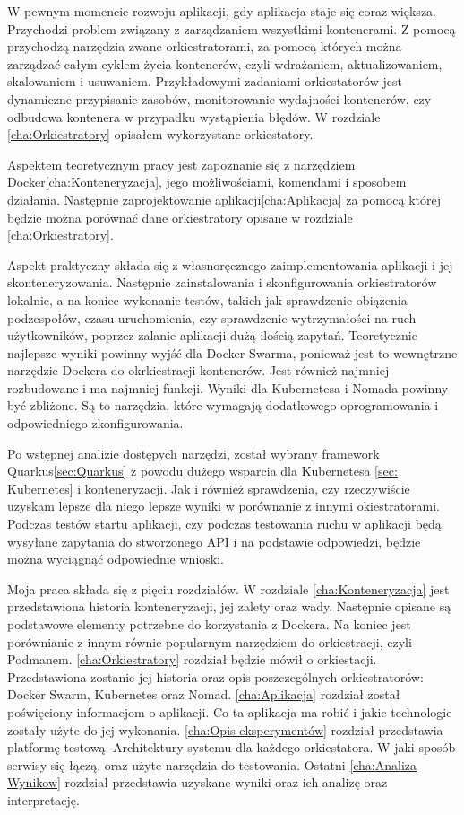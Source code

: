 \documentclass{iiuwb}
\begin{document}
W pewnym momencie rozwoju aplikacji, gdy aplikacja staje się coraz większa. Przychodzi problem związany z zarządzaniem wszystkimi kontenerami. Z pomocą przychodzą narzędzia zwane orkiestratorami, za pomocą których można zarządzać całym cyklem życia kontenerów, czyli wdrażaniem, aktualizowaniem, skalowaniem i usuwaniem. Przykładowymi zadaniami orkiestatorów jest dynamiczne przypisanie zasobów, monitorowanie wydajności kontenerów, czy odbudowa kontenera w przypadku wystąpienia błędów. W rozdziale \ref{cha:Orkiestratory} opisałem wykorzystane orkiestatory.

Aspektem teoretycznym pracy jest zapoznanie się z narzędziem Docker\ref{cha:Konteneryzacja}, jego możliwościami, komendami i sposobem działania. Następnie zaprojektowanie aplikacji\ref{cha:Aplikacja} za pomocą której będzie można porównać dane orkiestratory opisane w rozdziale \ref{cha:Orkiestratory}.

Aspekt praktyczny składa się z własnoręcznego zaimplementowania aplikacji i jej skonteneryzowania. Następnie zainstalowania i skonfigurowania orkiestratorów lokalnie, a na koniec wykonanie testów, takich jak sprawdzenie obiążenia podzespołów, czasu uruchomienia, czy sprawdzenie wytrzymałości na ruch użytkowników, poprzez zalanie aplikacji dużą ilością zapytań. Teoretycznie najlepsze wyniki powinny wyjść dla Docker Swarma, ponieważ jest to wewnętrzne narzędzie Dockera do okrkiestracji kontenerów. Jest również najmniej rozbudowane i ma najmniej funkcji. Wyniki dla Kubernetesa i Nomada powinny być zbliżone. Są to narzędzia, które wymagają dodatkowego oprogramowania i odpowiedniego zkonfigurowania.

Po wstępnej analizie dostępych narzędzi, został wybrany framework Quarkus\ref{sec:Quarkus} z powodu dużego wsparcia dla Kubernetesa \ref{sec: Kubernetes} i konteneryzacji. Jak i również sprawdzenia, czy rzeczywiście uzyskam lepsze dla niego lepsze wyniki w porównanie z innymi okiestratorami. Podczas testów startu aplikacji, czy podczas testowania ruchu w aplikacji będą wysyłane zapytania do stworzonego API i na podstawie odpowiedzi, będzie można wyciągnąć odpowiednie wnioski.
\newline

Moja praca składa się z pięciu rozdziałów. W rozdziale \ref{cha:Konteneryzacja} jest przedstawiona historia konteneryzacji, jej zalety oraz wady. Następnie opisane są podstawowe elementy potrzebne do korzystania z Dockera. Na koniec jest porównianie z innym równie popularnym narzędziem do orkiestracji, czyli Podmanem. \ref{cha:Orkiestratory} rozdział będzie mówił o orkiestacji. Przedstawiona zostanie jej historia oraz opis poszczególnych orkiestratorów: Docker Swarm, Kubernetes oraz Nomad. \ref{cha:Aplikacja} rozdział został poświęciony informacjom o aplikacji. Co ta aplikacja ma robić i jakie technologie zostały użyte do jej wykonania. \ref{cha:Opis eksperymentów} rozdział przedstawia platformę testową. Architektury systemu dla każdego orkiestatora. W jaki sposób serwisy się łączą, oraz użyte narzędzia do testowania. Ostatni \ref{cha:Analiza Wynikow} rozdział przedstawia uzyskane wyniki oraz ich analizę oraz interpretację.
\end{document}
